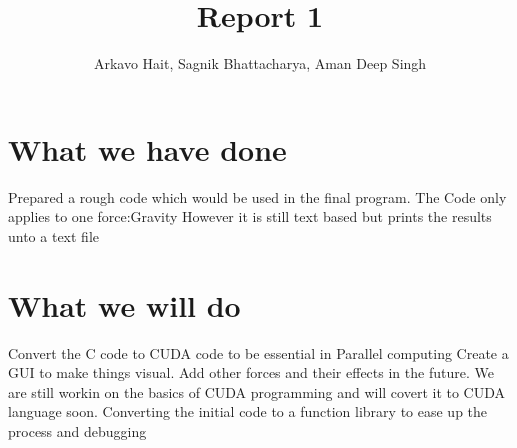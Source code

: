 \documentclass{article}
\title{Report 1}
\author{Arkavo Hait, Sagnik Bhattacharya, Aman Deep Singh}
\begin{document}
\maketitle
\section{What we have done}

Prepared a rough code which would be used in the final program.
The Code only applies to one force:Gravity
However it is still text based but prints the results unto a text file

\section{What we will do}

Convert the C code to CUDA code to be essential in Parallel computing
Create a GUI to make things visual.
Add other forces and their effects in the future.
We are still workin on the basics of CUDA programming and will covert it to CUDA language soon.
Converting the initial code to a function library to ease up the process and debugging
\end{document}
